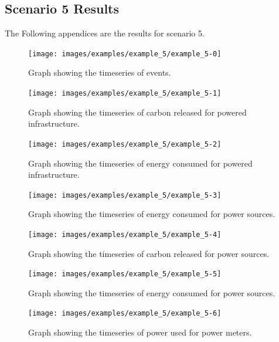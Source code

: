 \documentclass{l4proj}
\begin{document}
\begin{appendices}
\section{Scenario 5 Results}\label{apen:subsec:scen5}
The Following appendices are the results for scenario 5.
\clearpage
\begin{figure}[htbp]
    \centering
    \texttt{[image: images/examples/example\_5/example\_5-0]}
    ~
    \caption{Graph showing the timeseries of events.}
    \label{fig:example5-0}
\end{figure}
\clearpage
\begin{figure}[htbp]
    \centering
    \texttt{[image: images/examples/example\_5/example\_5-1]}
    ~
    \caption{Graph showing the timeseries of carbon released for powered infrastructure.}
    \label{fig:example5-1}
\end{figure}
\clearpage
\begin{figure}[htbp]
    \centering
    \texttt{[image: images/examples/example\_5/example\_5-2]}
    ~
    \caption{Graph showing the timeseries of energy consumed for powered infrastructure.}
    \label{fig:example5-2}
\end{figure}
\clearpage
\begin{figure}[htbp]
    \centering
    \texttt{[image: images/examples/example\_5/example\_5-3]}
    ~
    \caption{Graph showing the timeseries of energy consumed for power sources.}
    \label{fig:example5-3}
\end{figure}
\clearpage
\begin{figure}[htbp]
    \centering
    \texttt{[image: images/examples/example\_5/example\_5-4]}
    ~
    \caption{Graph showing the timeseries of carbon released for power sources.}
    \label{fig:example5-4}
\end{figure}
\clearpage
\begin{figure}[htbp]
    \centering
    \texttt{[image: images/examples/example\_5/example\_5-5]}
    ~
    \caption{Graph showing the timeseries of energy consumed for power sources.}
    \label{fig:example5-5}
\end{figure}
\clearpage
\begin{figure}[htbp]
    \centering
    \texttt{[image: images/examples/example\_5/example\_5-6]}
    ~
    \caption{Graph showing the timeseries of power used for power meters.}
    \label{fig:example5-6}
\end{figure}


\end{appendices}
\end{document}

